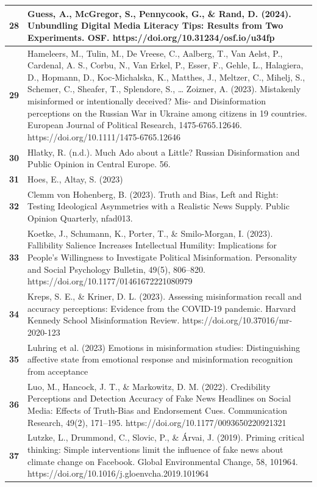 \documentclass[
  doc,floatsintext]{apa6}
\begin{document}
\begin{longtable}[t]{>{}r||>{\raggedright\arraybackslash}p{30em}}
\hline
\textbf{28} & Guess, A., McGregor, S., Pennycook, G., \& Rand, D. (2024). Unbundling Digital Media Literacy Tips: Results from Two Experiments. OSF. https://doi.org/10.31234/osf.io/u34fp\\
\hline
\textbf{29} & Hameleers, M., Tulin, M., De Vreese, C., Aalberg, T., Van Aelst, P., Cardenal, A. S., Corbu, N., Van Erkel, P., Esser, F., Gehle, L., Halagiera, D., Hopmann, D., Koc‐Michalska, K., Matthes, J., Meltzer, C., Mihelj, S., Schemer, C., Sheafer, T., Splendore, S., … Zoizner, A. (2023). Mistakenly misinformed or intentionally deceived? Mis‐ and Disinformation perceptions on the Russian War in Ukraine among citizens in 19 countries. European Journal of Political Research, 1475-6765.12646. https://doi.org/10.1111/1475-6765.12646\\
\hline
\textbf{30} & Hlatky, R. (n.d.). Much Ado about a Little? Russian Disinformation and Public Opinion in Central Europe. 56.\\
\hline
\textbf{31} & Hoes, E., Altay, S. (2023)\\
\hline
\textbf{32} & Clemm von Hohenberg, B. (2023). Truth and Bias, Left and Right: Testing Ideological Asymmetries with a Realistic News Supply. Public Opinion Quarterly, nfad013.\\
\hline
\textbf{33} & Koetke, J., Schumann, K., Porter, T., \& Smilo-Morgan, I. (2023). Fallibility Salience Increases Intellectual Humility: Implications for People’s Willingness to Investigate Political Misinformation. Personality and Social Psychology Bulletin, 49(5), 806–820. https://doi.org/10.1177/01461672221080979\\
\hline
\textbf{34} & Kreps, S. E., \& Kriner, D. L. (2023). Assessing misinformation recall and accuracy perceptions: Evidence from the COVID-19 pandemic. Harvard Kennedy School Misinformation Review. https://doi.org/10.37016/mr-2020-123\\
\hline
\textbf{35} & Luhring et al. (2023) Emotions in misinformation studies: Distinguishing affective state from emotional response and misinformation recognition from acceptance\\
\hline
\textbf{36} & Luo, M., Hancock, J. T., \& Markowitz, D. M. (2022). Credibility Perceptions and Detection Accuracy of Fake News Headlines on Social Media: Effects of Truth-Bias and Endorsement Cues. Communication Research, 49(2), 171–195. https://doi.org/10.1177/0093650220921321\\
\hline
\textbf{37} & Lutzke, L., Drummond, C., Slovic, P., \& Árvai, J. (2019). Priming critical thinking: Simple interventions limit the influence of fake news about climate change on Facebook. Global Environmental Change, 58, 101964. https://doi.org/10.1016/j.gloenvcha.2019.101964\\

\end{longtable}
\end{document}
